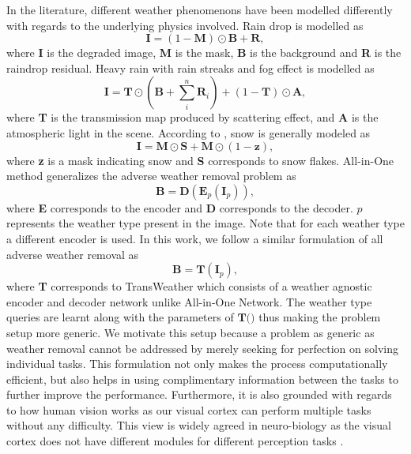 \documentclass[10pt,twocolumn,letterpaper]{article}
\begin{document}
In the literature, different weather phenomenons have been modelled differently with regards to the underlying physics involved. Rain drop \cite{qian2018attentive} is modelled as 
\begin{equation}
	\textbf{I} = (1-\textbf{M}) \odot \textbf{B} + \textbf{R},
\end{equation}
where \textbf{I} is the degraded image, \textbf{M} is the mask, \textbf{B} is the background and \textbf{R} is the raindrop residual. Heavy rain with rain streaks and fog effect \cite{li2019heavy} is modelled as 
\begin{equation}
	\textbf{I} = \textbf{T} \odot (\textbf{B} + \sum_i^n \textbf{R}_i) + (1-\textbf{T}) \odot \textbf{A},
\end{equation}
where \textbf{T} is the transmission map produced by scattering effect,  and \textbf{A} is the atmospheric light in the scene. According to \cite{liu2018desnownet}, snow is generally modeled as 
\begin{equation}
	\textbf{I} = \textbf{M} \odot \textbf{S} + \textbf{M} \odot (1-\textbf{z}),
\end{equation}
where \textbf{z} is a mask indicating snow and \textbf{S} corresponds to snow flakes. All-in-One method \cite{li2020all} generalizes the adverse weather removal problem as
\begin{equation}
	\textbf{B} = \textbf{D}(\textbf{E}_p(\textbf{I}_p)),
\end{equation}
where \textbf{E} corresponds to the encoder and \textbf{D} corresponds to the decoder. $p$ represents the weather type present in the image. Note that for each weather type a different encoder is used. In this work, we follow a similar formulation of all adverse weather removal as
\begin{equation}
	\textbf{B} = \textbf{T}(\textbf{I}_p),
\end{equation}
where \textbf{T} corresponds to TransWeather which consists of a weather agnostic encoder and decoder network unlike All-in-One Network. The weather type queries are learnt along with the parameters of $\textbf{T()}$ thus making the problem setup more generic. We motivate this setup because a problem as generic as weather removal cannot be addressed
by merely seeking for perfection on solving individual
tasks. This formulation not only makes the process computationally efficient, but also helps in using complimentary information between the tasks to further improve the performance. Furthermore, it is also grounded with regards to how human vision works as our visual cortex can perform multiple tasks without any difficulty.  This view is widely agreed in neuro-biology as the visual cortex does not have different modules for different perception tasks \cite{mcmanus2011adaptive, li2004perceptual}.
\end{document}
